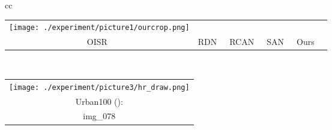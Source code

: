 \documentclass[10pt,twocolumn,letterpaper]{article}
\newcommand{\widthscalefive}{0.145}
\begin{document}
\begin{figure*}[htbp]
\begin{tabular}{cc}
\begin{adjustbox}{valign=t}
\begin{tabular}{cccccc}
				\texttt{[image: ./experiment/picture1/ourcrop.png]}  
				\\ 
				OISR~\cite{he2019ode} \hspace{\fsdttwofigBD} &
				RDN~\cite{zhang2018residual} \hspace{\fsdttwofigBD} &
				RCAN~\cite{zhang2018image} \hspace{\fsdttwofigBD} &
				SAN~\cite{dai2019second}  \hspace{\fsdttwofigBD} &
				Ours 
			 \hspace{\fsdttwofigBD} 
				\\
			\end{tabular}
		\end{adjustbox}
		\vspace{0.5mm}
		\\

		\begin{adjustbox}{valign=t}
\begin{tabular}{c}
				\texttt{[image: ./experiment/picture3/hr\_draw.png]}
				\\
				 Urban100 ():
				\\
				img\_078



\end{tabular}
\end{adjustbox}
\end{tabular}
\end{figure*}
\end{document}
